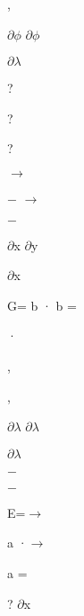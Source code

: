 \documentclass[a4paper,portrait,12pt]{article}
\begin{document}
,


\begin{flushleft}
$\partial$$\phi$ $\partial$$\phi$
\end{flushleft}


\begin{flushleft}
$\partial$$\lambda$
\end{flushleft}


?


?


?


$\rightarrow$


$-$ $\rightarrow$


$-$


\begin{flushleft}
$\partial$x $\partial$y
\end{flushleft}


\begin{flushleft}
$\partial$x
\end{flushleft}


\begin{flushleft}
G= b · b =
\end{flushleft}


·


,


,


\begin{flushleft}
$\partial$$\lambda$ $\partial$$\lambda$
\end{flushleft}


\begin{flushleft}
$\partial$$\lambda$
\end{flushleft}





$-$


$-$


\begin{flushleft}
E=$\rightarrow$
\end{flushleft}


\begin{flushleft}
a ·$\rightarrow$
\end{flushleft}


\begin{flushleft}
a =
\end{flushleft}





\begin{flushleft}
? $\partial$x
\end{flushleft}
\end{document}

